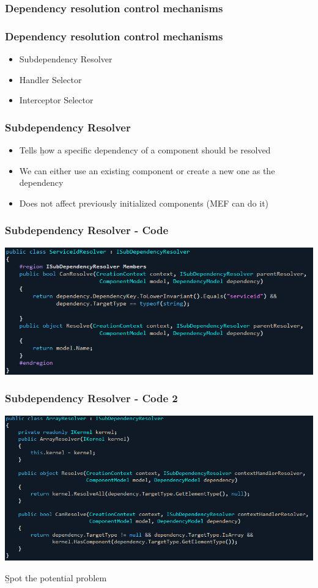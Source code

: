 \documentclass[turkish,handout]{beamer}
\begin{document}
			\subsubsection{Dependency resolution control mechanisms}
				\frame
				{
					\frametitle{Dependency resolution control mechanisms}
			  	\begin{itemize}
			  	  \item<1->Subdependency Resolver
			  		\item<2->Handler Selector
			  		\item<3->Interceptor Selector
			  	\end{itemize}
			 }
			 	\frame
				{
					\frametitle{Subdependency Resolver}
			  	\begin{itemize}
			  	  \item<1->Tells \b{how} a specific dependency of a component should be resolved
			  		\item<2->We can either use an existing component or create a new one as the dependency
			  		\item<3->Does not affect previously initialized components (MEF can do it)
			  	\end{itemize}
			 }
			 	\frame
				{
					\frametitle{Subdependency Resolver - Code}
					\begin{center}
						\includegraphics[scale=0.40]{images/serviceidresolver.png}
					\end{center}
			  }
			 	\frame
				{
					\frametitle{Subdependency Resolver - Code 2}
					\begin{center}
						\includegraphics[scale=0.40]{images/arrayresolver.png}
					\end{center}
					\newline
					\b{Spot the potential problem}			  
				}				
\end{document}
